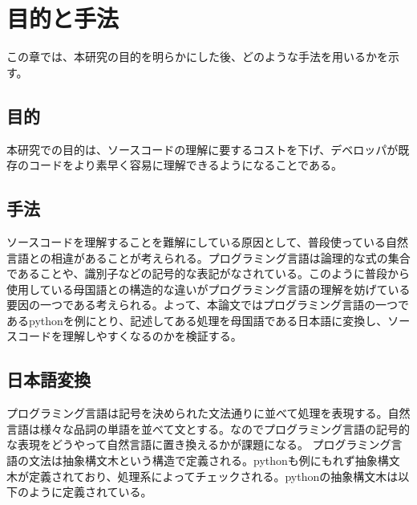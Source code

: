 \chapter{目的と手法}
\label{chap:design}

この章では、本研究の目的を明らかにした後、どのような手法を用いるかを示す。

\section{目的}

本研究での目的は、ソースコードの理解に要するコストを下げ、デベロッパが既存のコードをより素早く容易に理解できるようになることである。

\section{手法}

ソースコードを理解することを難解にしている原因として、普段使っている自然言語との相違があることが考えられる。プログラミング言語は論理的な式の集合であることや、識別子などの記号的な表記がなされている。このように普段から使用している母国語との構造的な違いがプログラミング言語の理解を妨げている要因の一つである考えられる。よって、本論文ではプログラミング言語の一つであるpythonを例にとり、記述してある処理を母国語である日本語に変換し、ソースコードを理解しやすくなるのかを検証する。

\section{日本語変換}

プログラミング言語は記号を決められた文法通りに並べて処理を表現する。自然言語は様々な品詞の単語を並べて文とする。なのでプログラミング言語の記号的な表現をどうやって自然言語に置き換えるかが課題になる。
プログラミング言語の文法は抽象構文木という構造で定義される。pythonも例にもれず抽象構文木が定義されており、処理系によってチェックされる。pythonの抽象構文木は以下のように定義されている。

